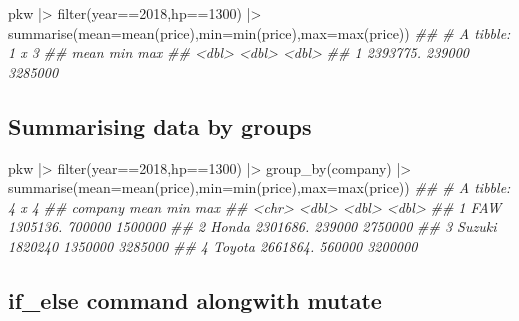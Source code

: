 \documentclass[
  letterpaper,
  DIV=11,
  numbers=noendperiod]{scrartcl}
\newenvironment{Shaded}{\begin{snugshade}}{\end{snugshade}}
\newcommand{\AttributeTok}[1]{\textcolor[rgb]{0.40,0.45,0.13}{#1}}
\newcommand{\DecValTok}[1]{\textcolor[rgb]{0.68,0.00,0.00}{#1}}
\newcommand{\DocumentationTok}[1]{\textcolor[rgb]{0.37,0.37,0.37}{\textit{#1}}}
\newcommand{\FunctionTok}[1]{\textcolor[rgb]{0.28,0.35,0.67}{#1}}
\newcommand{\NormalTok}[1]{\textcolor[rgb]{0.00,0.23,0.31}{#1}}
\newcommand{\SpecialCharTok}[1]{\textcolor[rgb]{0.37,0.37,0.37}{#1}}
\begin{document}
\begin{Shaded}
\begin{Highlighting}[]
\NormalTok{pkw }\SpecialCharTok{|\textgreater{}} \FunctionTok{filter}\NormalTok{(year}\SpecialCharTok{==}\DecValTok{2018}\NormalTok{,hp}\SpecialCharTok{==}\DecValTok{1300}\NormalTok{) }\SpecialCharTok{|\textgreater{}} \FunctionTok{summarise}\NormalTok{(}\AttributeTok{mean=}\FunctionTok{mean}\NormalTok{(price),}\AttributeTok{min=}\FunctionTok{min}\NormalTok{(price),}\AttributeTok{max=}\FunctionTok{max}\NormalTok{(price))}
\DocumentationTok{\#\# \# A tibble: 1 x 3}
\DocumentationTok{\#\#       mean    min     max}
\DocumentationTok{\#\#      \textless{}dbl\textgreater{}  \textless{}dbl\textgreater{}   \textless{}dbl\textgreater{}}
\DocumentationTok{\#\# 1 2393775. 239000 3285000}
\end{Highlighting}
\end{Shaded}

\hypertarget{summarising-data-by-groups}{%
\subsection{Summarising data by
groups}\label{summarising-data-by-groups}}

\begin{Shaded}
\begin{Highlighting}[]

\NormalTok{pkw }\SpecialCharTok{|\textgreater{}} \FunctionTok{filter}\NormalTok{(year}\SpecialCharTok{==}\DecValTok{2018}\NormalTok{,hp}\SpecialCharTok{==}\DecValTok{1300}\NormalTok{) }\SpecialCharTok{|\textgreater{}} \FunctionTok{group\_by}\NormalTok{(company) }\SpecialCharTok{|\textgreater{}} \FunctionTok{summarise}\NormalTok{(}\AttributeTok{mean=}\FunctionTok{mean}\NormalTok{(price),}\AttributeTok{min=}\FunctionTok{min}\NormalTok{(price),}\AttributeTok{max=}\FunctionTok{max}\NormalTok{(price))}
\DocumentationTok{\#\# \# A tibble: 4 x 4}
\DocumentationTok{\#\#   company     mean     min     max}
\DocumentationTok{\#\#   \textless{}chr\textgreater{}      \textless{}dbl\textgreater{}   \textless{}dbl\textgreater{}   \textless{}dbl\textgreater{}}
\DocumentationTok{\#\# 1 FAW     1305136.  700000 1500000}
\DocumentationTok{\#\# 2 Honda   2301686.  239000 2750000}
\DocumentationTok{\#\# 3 Suzuki  1820240  1350000 3285000}
\DocumentationTok{\#\# 4 Toyota  2661864.  560000 3200000}
\end{Highlighting}
\end{Shaded}

\hypertarget{if_else-command-alongwith-mutate}{%
\subsection{if\_else command alongwith
mutate}\label{if_else-command-alongwith-mutate}}
\end{document}
